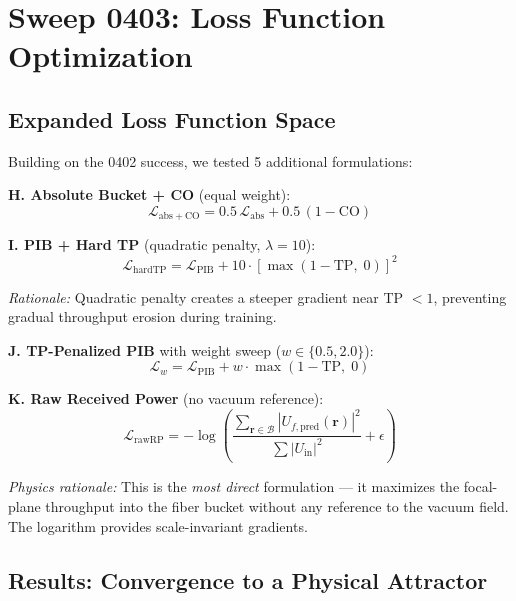 \documentclass[11pt,a4paper]{article}
\begin{document}
\section{Sweep 0403: Loss Function Optimization}
\label{sec:0403}

\subsection{Expanded Loss Function Space}

Building on the 0402 success, we tested 5 additional formulations:

\noindent\textbf{H. Absolute Bucket + CO} (equal weight):
\begin{equation}
\mathcal{L}_{\mathrm{abs+CO}} = 0.5\,\mathcal{L}_{\mathrm{abs}} + 0.5\,(1 - \mathrm{CO})
\end{equation}

\noindent\textbf{I. PIB + Hard TP} (quadratic penalty, $\lambda = 10$):
\begin{equation}
\mathcal{L}_{\mathrm{hardTP}} = \mathcal{L}_{\mathrm{PIB}} + 10 \cdot \left[\max(1 - \mathrm{TP},\;0)\right]^2
\end{equation}

\textit{Rationale:} Quadratic penalty creates a steeper gradient near TP $< 1$, preventing gradual throughput erosion during training.

\noindent\textbf{J. TP-Penalized PIB} with weight sweep ($w \in \{0.5, 2.0\}$):
\begin{equation}
\mathcal{L}_{w} = \mathcal{L}_{\mathrm{PIB}} + w \cdot \max(1 - \mathrm{TP},\; 0)
\end{equation}

\noindent\textbf{K. Raw Received Power} (no vacuum reference):
\begin{equation}
\mathcal{L}_{\mathrm{rawRP}} = -\log\!\left(\frac{\sum_{\mathbf{r} \in \mathcal{B}} |U_{f,\mathrm{pred}}(\mathbf{r})|^2}{\sum |U_{\mathrm{in}}|^2} + \epsilon\right)
\label{eq:raw_rp}
\end{equation}

\textit{Physics rationale:} This is the \textit{most direct} formulation --- it maximizes the focal-plane throughput into the fiber bucket without any reference to the vacuum field. The logarithm provides scale-invariant gradients.

\subsection{Results: Convergence to a Physical Attractor}
\end{document}
